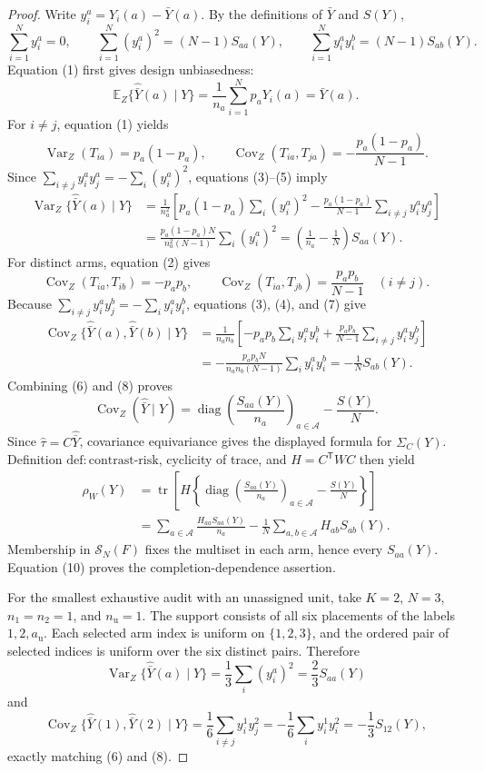 \documentclass{article}
\begin{document}
\begin{proof}
Write \(y_i^a=Y_i(a)-\bar Y(a)\). By the definitions of \(\bar Y\) and \(S(Y)\),
\[
\sum_{i=1}^Ny_i^a=0,
\qquad
\sum_{i=1}^N(y_i^a)^2=(N-1)S_{aa}(Y),
\qquad
\sum_{i=1}^Ny_i^ay_i^b=(N-1)S_{ab}(Y).
\tag{3}
\]
Equation (1) first gives design unbiasedness:
\[
\mathbb E_Z\{\widehat{\bar Y}(a)\mid Y\}
=\frac1{n_a}\sum_{i=1}^Np_aY_i(a)=\bar Y(a).
\tag{4}
\]
For \(i\ne j\), equation (1) yields
\[
\operatorname{Var}_Z(T_{ia})=p_a(1-p_a),
\qquad
\operatorname{Cov}_Z(T_{ia},T_{ja})=-\frac{p_a(1-p_a)}{N-1}.
\tag{5}
\]
Since \(\sum_{i\ne j}y_i^ay_j^a=-\sum_i(y_i^a)^2\), equations (3)--(5) imply
\[
\begin{aligned}
\operatorname{Var}_Z\{\widehat{\bar Y}(a)\mid Y\}
&=\frac1{n_a^2}\left[
p_a(1-p_a)\sum_i(y_i^a)^2
-\frac{p_a(1-p_a)}{N-1}\sum_{i\ne j}y_i^ay_j^a
\right]\\
&=\frac{p_a(1-p_a)N}{n_a^2(N-1)}\sum_i(y_i^a)^2
=\left(\frac1{n_a}-\frac1N\right)S_{aa}(Y).
\end{aligned}
\tag{6}
\]
For distinct arms, equation (2) gives
\[
\operatorname{Cov}_Z(T_{ia},T_{ib})=-p_ap_b,
\qquad
\operatorname{Cov}_Z(T_{ia},T_{jb})=\frac{p_ap_b}{N-1}\quad(i\ne j).
\tag{7}
\]
Because \(\sum_{i\ne j}y_i^ay_j^b=-\sum_i y_i^ay_i^b\), equations (3), (4), and (7) give
\[
\begin{aligned}
\operatorname{Cov}_Z\{\widehat{\bar Y}(a),\widehat{\bar Y}(b)\mid Y\}
&=\frac1{n_an_b}\left[
-p_ap_b\sum_i y_i^ay_i^b
+\frac{p_ap_b}{N-1}\sum_{i\ne j}y_i^ay_j^b
\right]\\
&=-\frac{p_ap_bN}{n_an_b(N-1)}\sum_i y_i^ay_i^b
=-\frac1N S_{ab}(Y).
\end{aligned}
\tag{8}
\]
Combining (6) and (8) proves
\[
\operatorname{Cov}_Z(\widehat{\bar Y}\mid Y)
=\operatorname{diag}\left(\frac{S_{aa}(Y)}{n_a}\right)_{a\in\mathcal A}-\frac{S(Y)}N.
\tag{9}
\]
Since \(\widehat\tau=C\widehat{\bar Y}\), covariance equivariance gives the displayed formula for \(\Sigma_C(Y)\). Definition \(\mathrm{def{:}contrast\text{-}risk}\), cyclicity of trace, and \(H=C^{\mathsf T}WC\) then yield
\[
\begin{aligned}
\rho_W(Y)
&=\operatorname{tr}\!\left[H\left\{
\operatorname{diag}\left(\frac{S_{aa}(Y)}{n_a}\right)_{a\in\mathcal A}-\frac{S(Y)}N
\right\}\right]\\
&=\sum_{a\in\mathcal A}\frac{H_{aa}S_{aa}(Y)}{n_a}
-\frac1N\sum_{a,b\in\mathcal A}H_{ab}S_{ab}(Y).
\end{aligned}
\tag{10}
\]
Membership in \(\mathcal S_N(F)\) fixes the multiset in each arm, hence every \(S_{aa}(Y)\). Equation (10) proves the completion-dependence assertion.

For the smallest exhaustive audit with an unassigned unit, take \(K=2\), \(N=3\), \(n_1=n_2=1\), and \(n_{\mathrm u}=1\). The support consists of all six placements of the labels \(1,2,a_{\mathrm u}\). Each selected arm index is uniform on \(\{1,2,3\}\), and the ordered pair of selected indices is uniform over the six distinct pairs. Therefore
\[
\operatorname{Var}_Z\{\widehat{\bar Y}(a)\mid Y\}
=\frac13\sum_i(y_i^a)^2=\frac23S_{aa}(Y)
\]
and
\[
\operatorname{Cov}_Z\{\widehat{\bar Y}(1),\widehat{\bar Y}(2)\mid Y\}
=\frac16\sum_{i\ne j}y_i^1y_j^2
=-\frac16\sum_i y_i^1y_i^2=-\frac13S_{12}(Y),
\]
exactly matching (6) and (8).
\end{proof}
\end{document}
